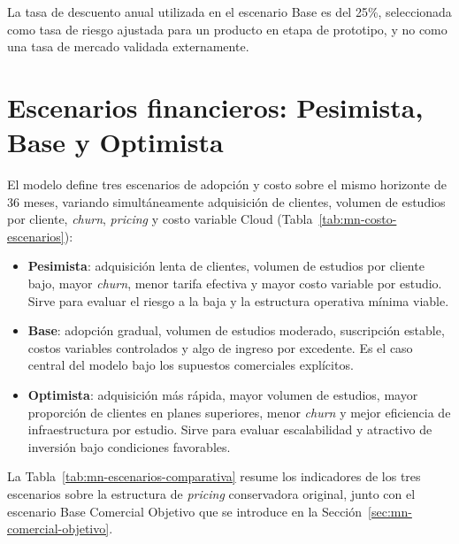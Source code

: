 La tasa de descuento anual utilizada en el escenario Base es del 25\%, seleccionada como tasa de riesgo ajustada para un producto en etapa de prototipo, y no como una tasa de mercado validada externamente.

\section{Escenarios financieros: Pesimista, Base y Optimista}
\label{sec:mn-escenarios}

El modelo define tres escenarios de adopción y costo sobre el mismo horizonte de 36 meses, variando simultáneamente adquisición de clientes, volumen de estudios por cliente, \textit{churn}, \textit{pricing} y costo variable Cloud (Tabla~\ref{tab:mn-costo-escenarios}):

\begin{itemize}
    \item \textbf{Pesimista}: adquisición lenta de clientes, volumen de estudios por cliente bajo, mayor \textit{churn}, menor tarifa efectiva y mayor costo variable por estudio. Sirve para evaluar el riesgo a la baja y la estructura operativa mínima viable.
    \item \textbf{Base}: adopción gradual, volumen de estudios moderado, suscripción estable, costos variables controlados y algo de ingreso por excedente. Es el caso central del modelo bajo los supuestos comerciales explícitos.
    \item \textbf{Optimista}: adquisición más rápida, mayor volumen de estudios, mayor proporción de clientes en planes superiores, menor \textit{churn} y mejor eficiencia de infraestructura por estudio. Sirve para evaluar escalabilidad y atractivo de inversión bajo condiciones favorables.
\end{itemize}

La Tabla~\ref{tab:mn-escenarios-comparativa} resume los indicadores de los tres escenarios sobre la estructura de \textit{pricing} conservadora original, junto con el escenario Base Comercial Objetivo que se introduce en la Sección~\ref{sec:mn-comercial-objetivo}.

